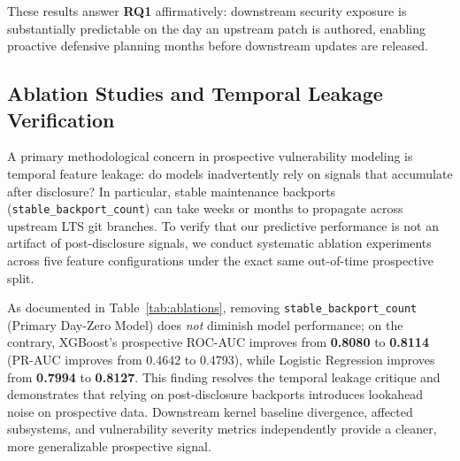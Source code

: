 \documentclass[final,5p,times,twocolumn]{elsarticle}
\begin{document}
These results answer \textbf{RQ1} affirmatively: downstream security exposure is substantially predictable on the day an upstream patch is authored, enabling proactive defensive planning months before downstream updates are released.

\subsection{Ablation Studies and Temporal Leakage Verification}
A primary methodological concern in prospective vulnerability modeling is temporal feature leakage: do models inadvertently rely on signals that accumulate after disclosure? In particular, stable maintenance backports (\texttt{stable\_backport\_count}) can take weeks or months to propagate across upstream LTS git branches. To verify that our predictive performance is not an artifact of post-disclosure signals, we conduct systematic ablation experiments across five feature configurations under the exact same out-of-time prospective split.

\begin{table}[t]
\centering
\caption{Feature group ablation experiments evaluated out-of-time ($\le$2023 train, $\ge$2024 test; $N_{\text{test}} = 32,536$).}
\label{tab:ablations}
\small
{}
\end{table}

As documented in Table~\ref{tab:ablations}, removing \texttt{stable\_backport\_count} (Primary Day-Zero Model) does \textit{not} diminish model performance; on the contrary, XGBoost's prospective ROC-AUC improves from \textbf{0.8080} to \textbf{0.8114} (PR-AUC improves from 0.4642 to 0.4793), while Logistic Regression improves from \textbf{0.7994} to \textbf{0.8127}. This finding resolves the temporal leakage critique and demonstrates that relying on post-disclosure backports introduces lookahead noise on prospective data. Downstream kernel baseline divergence, affected subsystems, and vulnerability severity metrics independently provide a cleaner, more generalizable prospective signal.
\end{document}
